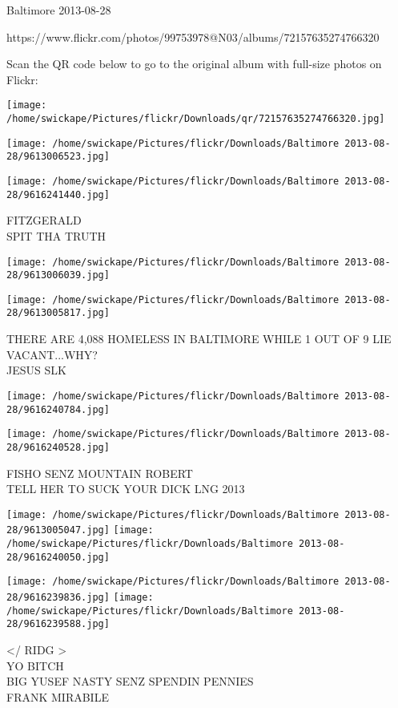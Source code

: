 \documentclass[10pt,letterpaper]{article}
\begin{document}
Baltimore 2013-08-28

https://www.flickr.com/photos/99753978@N03/albums/72157635274766320

Scan the QR code below to go to the original album with full-size photos on Flickr:

\texttt{[image: /home/swickape/Pictures/flickr/Downloads/qr/72157635274766320.jpg]}
\pagebreak

\texttt{[image: /home/swickape/Pictures/flickr/Downloads/Baltimore 2013-08-28/9613006523.jpg]}

\vspace{0.25in}
\texttt{[image: /home/swickape/Pictures/flickr/Downloads/Baltimore 2013-08-28/9616241440.jpg]}

FITZGERALD\\
SPIT THA TRUTH
\pagebreak

\texttt{[image: /home/swickape/Pictures/flickr/Downloads/Baltimore 2013-08-28/9613006039.jpg]}

\vspace{0.25in}
\texttt{[image: /home/swickape/Pictures/flickr/Downloads/Baltimore 2013-08-28/9613005817.jpg]}

THERE ARE 4,088 HOMELESS IN BALTIMORE WHILE 1 OUT OF 9 LIE VACANT...WHY?\\
JESUS SLK
\pagebreak

\texttt{[image: /home/swickape/Pictures/flickr/Downloads/Baltimore 2013-08-28/9616240784.jpg]}

\vspace{0.25in}
\texttt{[image: /home/swickape/Pictures/flickr/Downloads/Baltimore 2013-08-28/9616240528.jpg]}

FISHO SENZ MOUNTAIN ROBERT\\
TELL HER TO SUCK YOUR DICK LNG 2013
\pagebreak

\texttt{[image: /home/swickape/Pictures/flickr/Downloads/Baltimore 2013-08-28/9613005047.jpg]}
\texttt{[image: /home/swickape/Pictures/flickr/Downloads/Baltimore 2013-08-28/9616240050.jpg]}

\texttt{[image: /home/swickape/Pictures/flickr/Downloads/Baltimore 2013-08-28/9616239836.jpg]}
\texttt{[image: /home/swickape/Pictures/flickr/Downloads/Baltimore 2013-08-28/9616239588.jpg]}

</  RIDG >\\
YO BITCH\\
BIG YUSEF NASTY SENZ SPENDIN PENNIES\\
FRANK MIRABILE
\pagebreak
\end{document}
